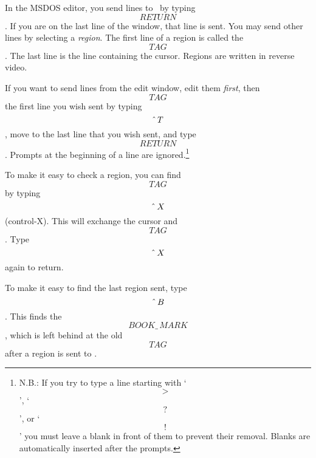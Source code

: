 {    In the MSDOS editor,
    you send lines to \ISETL\ by typing \[RETURN\].
    If you are on the last line of the window, that line is sent.
    You may send other lines by selecting a {\em region}.
    The  first line of a region is  called the \[TAG\].
    The last line is the line containing the cursor.
    Regions are written in reverse video.


    If you want to send 
    lines from the edit window, edit them {\em first}, then \[TAG\]
    the first line you wish sent by
    typing \[\mbox{\^\,} T\], move to the last line that you wish sent, and type
    \[RETURN\].  Prompts at the beginning of a line are ignored.\footnote{%
    N.B.:  If you try to type a line starting with
    `\[>\]', `\[?\]', or `\[!\]' you must
      leave a blank in front of them to prevent their removal.
    Blanks are automatically inserted after the prompts.}
    

    To make it easy to check a region, you can find \[TAG\] by typing
     \[\mbox{\^\,} X\] (control-X).  This will exchange the cursor and \[TAG\].
     Type \[\mbox{\^\,} X\] again to return.

    To make it easy to find the last region sent, type \[\mbox{\^\,} B\].
    This finds
    the \[BOOK\_\,MARK\], which is left behind at the old \[TAG\] after a region
    is sent to \ISETL.

}
